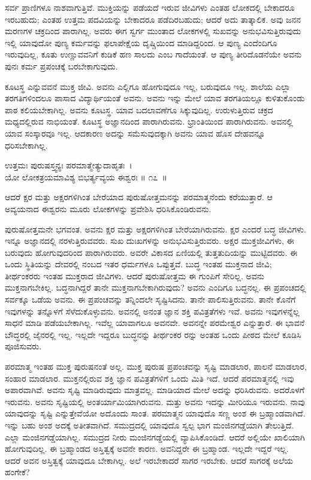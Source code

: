 ಸರ್ವ ಪ್ರಾಣಿಗಳೂ ನಾಶವಾಗುತ್ತಿವೆ. ಮುಕ್ತಿಯನ್ನು ಪಡೆಯದೆ ಇರುವ ಜೀವಿಗಳು ಎಂತಹ ಲೋಕದಲ್ಲಿ ಬೇಕಾದರೂ ಇರಬಹುದು; ಎಂತಹ ಉತ್ತಮ ಪದವಿಯನ್ನು ಬೇಕಾದರೂ ಪಡೆದಿರಬಹುದು; ಆದರೆ ಅದು ತಾತ್ಕಾಲಿಕ. ಅವು ಜನನ ಮರಣಗಳ ಚಕ್ರದಿಂದ ಪಾರಾಗಿಲ್ಲ. ಅವರು ಈಗ ಸ್ವರ್ಗ ಮುಂತಾದ ಲೋಕಗಳಲ್ಲಿ ಸುಖವನ್ನು ಅನುಭವಿಸುತ್ತಿರುವುದು ಇಲ್ಲಿ ಯಾವುದೋ ಪುಣ್ಯ ಕರ್ಮವನ್ನು ಫಲಾಪೇಕ್ಷೆಯ ದೃಷ್ಚಿಯಿಂದ ಮಾಡಿದ್ದರಿಂದ. ಆ ಪುಣ್ಯ ಎಂದೆಂದಿಗೂ ಇರುವುದಿಲ್ಲ, ಕೂತು ಉಣ್ಣುವವನಿಗೆ ಕುಡಿಕೆ ಹಣ ಸಾಲದು ಎಂಬ ಗಾದೆಯಂತೆ. ಆ ಪುಣ್ಯ ತೀರಿದೊಡನೆಯೇ ಅವನು ಪುನಃ ಕರ್ಮ ಪ್ರಪಂಚಕ್ಕೆ ಬರಬೇಕಾಗುವುದು.

ಕೂಟಸ್ಥ ಎನ್ನುವವನೆ ಮುಕ್ತ ಜೀವಿ. ಅವನು ಎಲ್ಲಿಗೂ ಹೋಗುವುದೂ ಇಲ್ಲ, ಬರುವುದೂ ಇಲ್ಲ. ಶಾಲೆಯ ಎಲ್ಲಾ ತರಗತಿಗಳಿಂದಲೂ ಪಾಸಾದ ವಿದ್ಯಾರ್ಥಿಯಂತೆ ಅವನು. ಅವನು ಇನ್ನು ಮೇಲೆ ಯಾವ ತರಗತಿಯಲ್ಲೂ ಕುಳಿತುಕೊಂಡು ಪಾಠ ಕಲಿಯಬೇಕಾಗಿಲ್ಲ. ಅವನು ಕೂಟಸ್ಥ. ಯಾವ ಬದಲಾವಣೆಗೂ ಸಿಕ್ಕುವುದಿಲ್ಲ. ಉರುಳುತ್ತಿರುವ ಚಕ್ರದ ಮಧ್ಯದಲ್ಲಿರುವ ನಾಭಿಯಂತೆ. ಕೂಟಸ್ಥ ಅಜ್ಞಾನದಿಂದ ಪಾರಾಗಿರುವನು. ಭ್ರಾಂತಿಯಿಂದ ಪಾರಾಗಿರುವನು. ಅವನಲ್ಲಿ ಯಾವ ಸಂಸ್ಕಾರವೂ ಇಲ್ಲ. ಆದಕಾರಣ ಅದನ್ನು ಸಮೆಸುವುದಕ್ಕಾಗಿ ಅವನು ಯಾವ ಹೊಸ ದೇಹವನ್ನೂ ಧರಿಸಬೇಕಾಗಿಲ್ಲ.

\begin{shloka}
ಉತ್ತಮಃ ಪುರುಷಸ್ತ್ವನ್ಯಃ ಪರಮಾತ್ಮೇತ್ಯುದಾಹೃತಃ~।\\ಯೋ ಲೋಕತ್ರಯಮಾವಿಶ್ಯ ಬಿಭರ್ತ್ಯವ್ಯಯ ಈಶ್ವರಃ \hfill॥ ೧೭~॥
\end{shloka}

\begin{artha}
ಆದರೆ ಕ್ಷರ ಮತ್ತು ಅಕ್ಷರಗಳಿಗಿಂತ ಬೇರೆಯಾದ ಪುರುಷೋತ್ತಮನನ್ನು ಪರಮಾತ್ಮನೆಂದು ಕರೆಯು\-ತ್ತಾರೆ. ಆ ಅವ್ಯಯನಾದ ಈಶ್ವರನು ಮೂರು ಲೋಕಗಳನ್ನು ಪ್ರವೇಶಿಸಿ ಧರಿಸಿಕೊಂಡಿರುವನು.
\end{artha}

ಪುರುಷೋತ್ತಮನೇ ಭಗವಂತ. ಅವನು ಕ್ಷರ ಮತ್ತು ಅಕ್ಷರಗಳಿಗಿಂತ ಬೇರೆಯಾಗಿರುವನು. ಕ್ಷರ ಎಂದರೆ ಬದ್ಧ ಜೀವಿಗಳು. ಇನ್ನೂ ಅಜ್ಞಾನದಲ್ಲಿ ನರಳುತ್ತಿರುವವರು. ಸುಖ ದುಃಖಗಳನ್ನು ಅನುಭವಿಸುತ್ತಿರುವರು. ಅಕ್ಷರ ಮುಕ್ತಜೀವಿಗಳು, ಈ ಬರುವುದು ಹೋಗುವುದರಿಂದ ಪಾರಾಗಿರುವರು. ಅವರೇ ವಿಕಾಸದ ಏಣಿಯಲ್ಲಿ ತುತ್ತತುದಿಯನ್ನು ಮುಟ್ಟಿದವರು. ಈ ಒಂದು ಸ್ಥಿತಿಯನ್ನು ದೇವರಲ್ಲಿ ನಂಬದ ಇತರ ಧರ್ಮಗಳೂ ಒಪ್ಪುತ್ತವೆ. ಬುದ್ಧ ಇಂತಹ ಮುಕ್ತನಾದ ಜೀವಿ; ತೀರ್ಥಂಕರರು ಇಂತಹ ಮುಕ್ತರಾದ ಜೀವಿಗಳು. ಆದರೆ ಪುರುಷೋತ್ತಮ ಈ ಗುಂಪಿಗೆ ಸೇರಿಲ್ಲ. ಅವನು ಮುಕ್ತನಾಗಬೇಕಿಲ್ಲ. ಬದ್ಧನಾಗಿದ್ದರೆ ತಾನೇ ಮುಕ್ತನಾಗಬೇಕಾಗಿರುವುದು? ಅವನು ಎಂದಿಗೂ ಬದ್ಧನಲ್ಲ. ಈ ಪ್ರಪಂಚದಲ್ಲಿ ಸರ್ವಕ್ಕೂ ಒಡೆಯ ಅವನು. ಈ ಪ್ರಪಂಚವನ್ನು ತನ್ನಿಂದಲೇ ಸೃಷ್ಟಿಸಿದನು. ತಾನೇ ಪಾಲಿಸುತ್ತಿರುವನು. ತಾನೇ ಕೊನೆಗೆ ಇವುಗಳನ್ನು ತನ್ನೊಳಗೆ ಸೆಳೆದುಕೊಳ್ಳುವನು. ಅವನಲ್ಲಿ ಅನಂತ ಜ್ಞಾನ ಶಕ್ತಿ ಪವಿತ್ರತೆಗಳು ಇವೆ. ಅವನು ಇವುಗಳನ್ನೆಲ್ಲ ಸಾಧನೆ ಮಾಡಿ ಪಡೆಯಬೇಕಾಗಿಲ್ಲ. ಇವೆಲ್ಲ ಯಾವಾಗಲೂ ಅವನವೇ. ಅವನನ್ನೇ ಪರಮೇಶ್ವರ ಎನ್ನುತ್ತಾರೆ. ಈ ಭಾವನೆ ಬೌದ್ಧರಲ್ಲಿ ಜೈನರಲ್ಲಿ ಇಲ್ಲ. ಇಲ್ಲದೇ ಇದ್ದರೂ ಬುದ್ಧನನ್ನು ತೀರ್ಥಂಕರ ರನ್ನು ಅಂತಹ ಒಂದು ಪೀಠದ ಮೇಲೆ ಕೂಡಿಸಿ ಪೂಜಿಸುವರು.

\newpage

ಪರಮಾತ್ಮ ಇಂತಹ ಮುಕ್ತ ಪುರುಷನಂತೆ ಅಲ್ಲ. ಮುಕ್ತ ಪುರುಷ ಪ್ರಪಂಚವನ್ನು ಸೃಷ್ಟಿ ಮಾಡಲಾರ, ಪಾಲನೆ ಮಾಡಲಾರ, ಸಂಹಾರ ಮಾಡಲಾರ. ಮುಕ್ತನಲ್ಲಿರುವ ಶಕ್ತಿ ಜ್ಞಾನ ಪವಿತ್ರತೆಗಳಿಗೆ ಒಂದು ಮಿತಿ ಇದೆ. ಆದರೆ ಪರಮಾತ್ಮನಲ್ಲಿ ಇವು ಅಪಾರವಾಗಿವೆ. ಅವನು ಸೃಷ್ಟಿ ಮಾಡಿರುವುದು ಮಾತ್ರವಲ್ಲ. ಮಾಡಿಯಾದ ಮೇಲೆ ಅದನ್ನು ಧರಿಸಿರುವನು. ಅದರೊಳಗೆ ಇರುವನು. ಅವನು ಸೃಷ್ಟಿಯಲ್ಲಿ ಅಂತರ್ಯಾಮಿಯಾಗಿರುವನು. ಮತ್ತು ಅವನು ಇದನ್ನು ಮೀರಿಯೂ ಇರುವನು. ನಾವು ಯಾವುದನ್ನು ಸೃಷ್ಟಿ ಎನ್ನುತ್ತೇವೆಯೋ ಅದೊಂದು ಸಾಂತ. ಪರಮಾತ್ಮನ ಯಾವುದೊ ಸಣ್ಣ ಅಂಶ ಈ ಬ್ರಹ್ಮಾಂಡವಾಗಿದೆ. ಇನ್ನು ಬಹು ಅಂಶ ಅದಕ್ಕೆ ಅತೀತವಾಗಿದೆ. ಸಮುದ್ರದಲ್ಲಿ ಯಾವುದೊ ಸ್ವಲ್ಪ ಭಾಗ ಮಂಜಿನಗಡ್ಡೆಯಾಗಿ ತೇಲುತ್ತಿದೆ. ಎಲ್ಲಾ ಮಂಜಿನಗಡ್ಡೆಯಾಗಿಲ್ಲ. ಸಮುದ್ರದ ನೀರು ಮಂಜಿನಗಡ್ಡೆಯಲ್ಲಿ ವ್ಯಾಪಿಸಿಕೊಂಡಿದೆ. ಆದರೆ ಅಲ್ಲಿಯೇ ಖಾಲಿಯಾಗಿ ಹೋಗುವುದಿಲ್ಲ. ಈ ಬ್ರಹ್ಮಾಂಡದ ಅಸ್ತಿತ್ವಕ್ಕೆ ಅವನೇ ಕಾರಣ. ಅವನಿದ್ದರೇ ಈ ಬ್ರಹ್ಮಾಂಡ. ಇಲ್ಲದೇ ಇದ್ದರೆ ಇಲ್ಲ. ಆದರೆ ಅವನ ಅಸ್ತಿತ್ವಕ್ಕೆ ಯಾವುದೂ ಬೇಕಾಗಿಲ್ಲ. ಅಲೆ ಇರಬೇಕಾದರೆ ಸಾಗರ ಇರಬೇಕು. ಆದರೆ ಸಾಗರಕ್ಕೆ ಅಲೆಯ ಹಂಗೇಕೆ?

